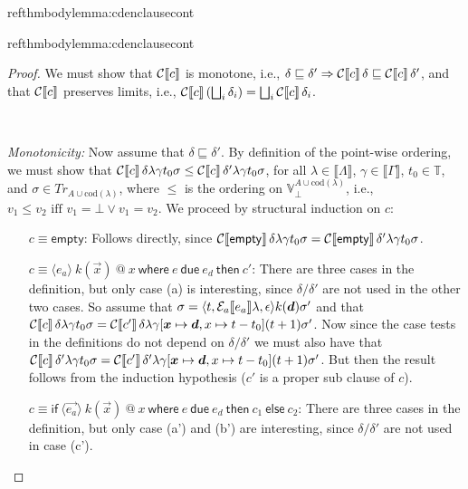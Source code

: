 \documentclass[orivec,final]{llncs-href}
\makeatletter
\newcommand{\timeset}{\mathbb{T}}
\newcommand{\traceset}[1]{\mathit{Tr}_{#1}}
\newcommand{\verdictset}[1]{\mathbb{V}^{#1}}
\newcommand{\verdictsetlift}[1]{\verdictset{#1}_{\bot}}
\newcommand{\cod}[1]{\mathrm{cod}(#1)}
\newcommand{\dendom}[1]{\llbracket #1 \rrbracket}
\newcommand{\trace}{\sigma}
\newcommand{\emptychoice}{\epsilon}
\newcommand{\event}[3]{\langle #1,#2,#3\rangle}
\newcommand{\cempty}{\mathsf{empty}}
\newcommand{\catomic}[6]{\langle#1\rangle\ #2\ \textsf{@}\ #3\
  \mathsf{where}\ #4\ \mathsf{due}\ #5\ \mathsf{then}\ #6}
\newcommand{\catomicp}[7]{\mathsf{if}\ \langle#1\rangle\ #2\ \textsf{@}\ #3\
  \mathsf{where}\ #4\ \mathsf{due}\ #5\ \mathsf{then}\ #6\
  \mathsf{else}\ #7}
\def\refthm#1{
  \phantomsection %
  \label{proof:#1}
  \ifthenelse{\equal{}{\csname refthmhint#1\endcsname}}
  { 
    \begin{refthmenv#1}[p. \pageref{#1}]
    \csname refthmbody#1\endcsname
    \end{refthmenv#1}
  }
  {
    \begin{refthmenv#1}[\csname refthmhint#1\endcsname, p. \pageref{#1}]
    \csname refthmbody#1\endcsname
    \end{refthmenv#1}
  }
}
\makeatother
\begin{document}
\refthm{lemma:cdenclausecont}
\begin{proof}
  We must show that $\mathcal{C}\!\left\llbracket c \right\rrbracket    $ is monotone, i.e.,
  $\delta \sqsubseteq \delta' \Rightarrow \mathcal{C}\!\left\llbracket c \right\rrbracket \delta   
  \sqsubseteq \mathcal{C}\!\left\llbracket c \right\rrbracket \delta'   $, and that
  $\mathcal{C}\!\left\llbracket c \right\rrbracket    $ preserves limits, i.e.,
  $\mathcal{C}\!\left\llbracket c \right\rrbracket (\bigsqcup_i \delta_i)    = \bigsqcup_i
  \mathcal{C}\!\left\llbracket c \right\rrbracket \delta_i   $.

  ~

  \emph{Monotonicity:}
  Now assume that $\delta \sqsubseteq \delta'$. By definition of the
  point-wise ordering, we must show that
  $\cdenclause{c}{\delta}{\lambda}{\gamma}{t_0}{\trace} \leq
  \cdenclause{c}{\delta'}{\lambda}{\gamma}{t_0}{\trace}$, for all
  $\lambda \in \dendom{\Lambda}$, $\gamma \in \dendom{\Gamma}$, $t_0
  \in \timeset$, and $\trace \in \traceset{A \cup \cod{\lambda}}$,
  where $\leq$ is the ordering on $\verdictsetlift{A \cup
    \cod{\lambda}}$, i.e., $v_1 \leq v_2 \mbox{ iff } v_1 = \bot \lor
  v_1 = v_2$. We proceed by structural induction on $c$:
  \begin{itemize}\itemsep=5pt
  \item[$c \equiv \cempty$:]
    Follows directly, since
    $\cdenclause{\cempty}{\delta}{\lambda}{\gamma}{t_0}{\trace} =
    \cdenclause{\cempty}{\delta'}{\lambda}{\gamma}{t_0}{\trace}$.
  \item[$c \equiv \catomic{e_a}{k(\vec{x})}{x}{e}{e_d}{c'}$:]
    There are three cases in the definition, but only case (a) is
    interesting, since $\delta/\delta'$ are not used in the other two cases.
    So assume that $\trace =
    \event{t}{\cdenaexp{e_a}{\lambda}}{\emptychoice}{k(\vec{d})}\trace'$
    and that $\cdenclause{c}{\delta}{\lambda}{\gamma}{t_0}{\trace} =
    \cdenclause{c'}{\delta}{\lambda}{\gamma[\vec{x} \mapsto \vec{d}, x
      \mapsto t - t_0]}{(t+1)}{\trace'}$. Now since the case tests in
    the definitions do not depend on $\delta/\delta'$ we must also
    have that $\cdenclause{c}{\delta'}{\lambda}{\gamma}{t_0}{\trace} =
    \cdenclause{c'}{\delta'}{\lambda}{\gamma[\vec{x} \mapsto \vec{d}, x
      \mapsto t - t_0]}{(t+1)}{\trace'}$. But then the
    result follows from the induction hypothesis ($c'$ is a proper
    sub clause of $c$).
  \item[$c \equiv \catomicp{\vec{e_a}}{k(\vec{x})}{x}{e}{e_d}{c_1}{c_2}$:]
    There are three cases in the definition, but only case (a') and (b') are
    interesting, since $\delta/\delta'$ are not used in case (c').
    \begin{itemize}

\end{itemize}
\end{itemize}
\end{proof}
\end{document}
